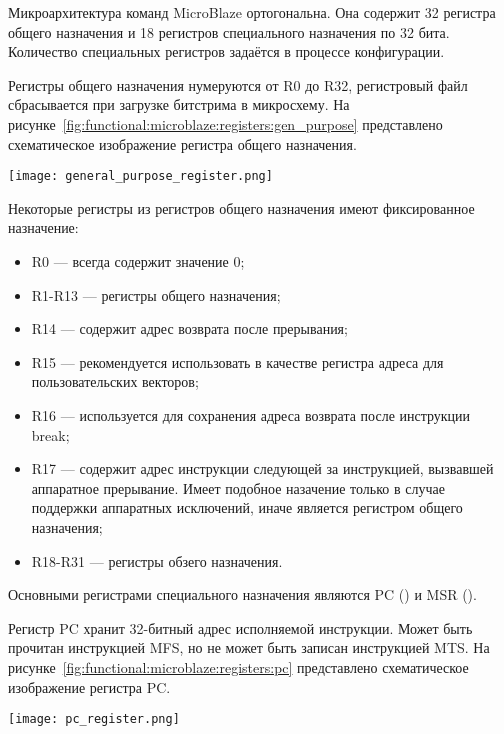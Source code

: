 Микроархитектура команд MicroBlaze ортогональна. Она содержит 32 регистра общего назначения
и 18 регистров специального назначения по 32 бита. Количество специальных регистров задаётся
в процессе конфигурации.

Регистры общего назначения нумеруются от R0 до R32, регистровый файл сбрасывается при загрузке
битстрима в микросхему. На рисунке~\ref{fig:functional:microblaze:registers:gen_purpose} представлено
схематическое изображение регистра общего назначения.

\begin{center}
  \centering
  \texttt{[image: general\_purpose\_register.png]}
  \label{fig:functional:microblaze:registers:gen_purpose}
\end{center}

Некоторые регистры из регистров общего назначения имеют фиксированное назначение:
\begin{itemize}
  \item R0 --- всегда содержит значение 0;
  \item R1-R13 --- регистры общего назначения;
  \item R14 --- содержит адрес возврата после прерывания;
  \item R15 --- рекомендуется использовать в качестве регистра
    адреса для пользовательских векторов;
  \item R16 --- используется для сохранения адреса возврата после инструкции break;
  \item R17 --- содержит адрес инструкции следующей за инструкцией, вызвавшей аппаратное
    прерывание. Имеет подобное назачение только в случае поддержки аппаратных исключений,
    иначе является регистром общего назначения;
  \item R18-R31 --- регистры обзего назначения.
\end{itemize}

Основными регистрами специального назначения являются PC () и MSR ().

Регистр PC хранит 32-битный адрес исполняемой инструкции. Может быть прочитан инструкцией MFS,
но не может быть записан инструкцией MTS. На рисунке~\ref{fig:functional:microblaze:registers:pc} представлено
схематическое изображение регистра PC.

\begin{center}
  \centering
  \texttt{[image: pc\_register.png]}
  \label{fig:functional:microblaze:registers:pc}
\end{center}

